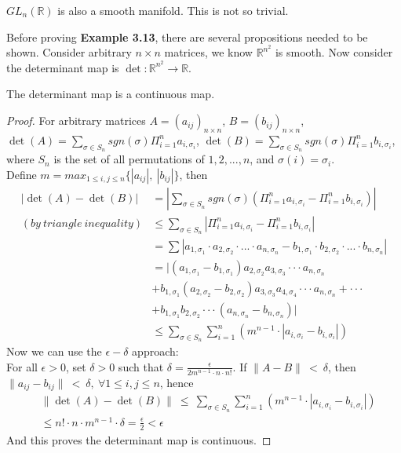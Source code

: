 \documentclass[12pt,twoside]{article}
\begin{document}
\begin{example}

$GL_n(\mathbb{R})$ is also a smooth manifold. This is not so trivial.
\end{example}
Before proving \textbf{Example 3.13}, there are several propositions needed to be shown. Consider arbitrary $n\times n$ matrices, we know $\mathbb{R}^{n^2}$ is smooth. Now consider the determinant map is $\det:\mathbb{R}^{n^2} \rightarrow \mathbb{R}$.
\begin{proposition}
\label{detmap}
The determinant map is a continuous map.
\begin{proof}
For arbitrary matrices $A=(a_{ij})_{n\times n}$, $B=(b_{ij})_{n\times n}$,
$\det(A) = \sum_{\sigma \in S_{n}} sgn(\sigma) \Pi_{i=1}^{n}a_{i,\sigma _{i}}$, $\det(B) = \sum_{\sigma \in S_{n}} sgn(\sigma) \Pi_{i=1}^{n}b_{i,\sigma _{i}}$, where $S_{n}$ is the set of all permutations of ${1,2,...,n}$, and $\sigma(i)=\sigma_{i}$.
\\
Define $m = max_{1\leqslant i, j\leqslant n}\{|a_{ij}|,\ |b_{ij}|\}$, then 
\begin{align}
    |\det(A)- \det(B)| &=|\sum_{\sigma \in S_{n}}sgn(\sigma)(\Pi_{i=1}^{n}a_{i,\sigma _{i}}-\Pi_{i=1}^{n}b_{i,\sigma _{i}})|
    \\
    (by\ triangle\ inequality) &\leqslant \sum_{\sigma \in S_{n} }|\Pi_{i=1}^{n}a_{i,\sigma _{i}}-\Pi_{i=1}^{n}b_{i,\sigma _{i}}| 
    \\
    & = \sum |a_{1,\sigma_{1}}\cdot a_{2,\sigma_{2}}\cdot ...\cdot a_{n,\sigma_{n}} - b_{1,\sigma_{1}}\cdot b_{2,\sigma_{2}}\cdot ...\cdot b_{n,\sigma_{n}}|
    \\
    & = |(a_{1,\sigma_{1}}-b_{1,\sigma_{1}})a_{2,\sigma_{2}}a_{3,\sigma_{3}}\cdot \cdot \cdot a_{n,\sigma_{n}}
    \\
    &+b_{1,\sigma_{1}}(a_{2,\sigma_{2}}-b_{2,\sigma_{2}})a_{3,\sigma_{3}}a_{4,\sigma_{4}}\cdot \cdot \cdot a_{n,\sigma_{n}}+\cdot \cdot \cdot
    \\
    &+b_{1,\sigma_{1}}b_{2,\sigma_{2}}\cdot \cdot \cdot(a_{n,\sigma_{n}}-b_{n,\sigma_{n}})|
    \\
    & \leqslant \sum_{\sigma \in S_{n}}\sum_{i=1}^{n}(m^{n-1}\cdot |a_{i,\sigma_{i}}-b_{i,\sigma_{i}}|)
\end{align}
Now we can use the $\epsilon - \delta$ approach:\\
For all $\epsilon > 0$, set $\delta > 0$ such that $\delta = \frac{\epsilon}{2m^{n-1}\cdot n \cdot n!}$. If $\parallel A-B \parallel\ <\ \delta$, then $\parallel a_{ij}-b_{ij} \parallel \ <\ \delta,\ \forall 1 \leqslant i, j\leqslant n$, hence
\begin{align}
&\parallel \det(A)-\det(B)\parallel\ \leqslant\ \sum_{\sigma \in S_{n}}\sum_{i=1}^{n}(m^{n-1}\cdot |a_{i,\sigma_{i}}-b_{i,\sigma_{i}}|)
\\
&\leqslant n!\cdot n \cdot m^{n-1}\cdot \delta = \frac{\epsilon}{2} < {\epsilon}
\end{align}
And this proves the determinant map is continuous.
\end{proof}
\end{proposition}
\end{document}
